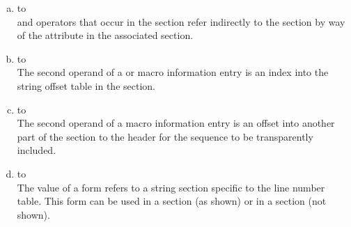\begin{enumerate}[(a)]
\item \dotdebugloc{} to \dotdebugaddr \\
\DWOPaddrx{} and \DWOPconstx{} operators that occur in the 
\dotdebugloc{} section refer indirectly to the 
\dotdebugaddr{} section by way of the 
\DWATaddrbase{} attribute in the associated \dotdebuginfo{} 
section. 

\item \dotdebugmacro{} to \dotdebugstroffsets \\
The second operand of a 
\DWMACROdefineindirectx{} or \DWMACROundefindirectx{} 
macro information entry is an index
into the string offset table in the 
\dotdebugstroffsets{} section.

\item \dotdebugmacro{} to \dotdebugmacro \\
The second operand of a 
\DWMACROtransparentinclude{} macro information
entry is an offset into another part of the 
\dotdebugmacro{} section to the header for the 
sequence to be transparently included.

\item \dotdebugline{} to \dotdebuglinestr \\
The value of a \DWFORMlinestrp{} form refers to a
string section specific to the line number table.
This form can be used in a \dotdebugline{} section
(as shown) or in a \dotdebuginfo{} section (not shown).

\end{enumerate}
